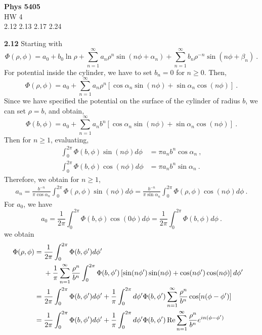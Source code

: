 \documentclass[12pt]{article}
\begin{document}
\begin{center}
{\bf Phys 5405}\\
HW 4 \\
2.12 2.13 2.17 2.24
\end{center}
\textbf{2.12} Starting with
\begin{equation}
    \Phi(\rho, \phi) = a_0 + b_0 \ln \rho + \sum_{n=1}^\infty a_n \rho^n \sin(n \phi + \alpha_n) + \sum_{n=1}^\infty b_n \rho^{-n} \sin(n \phi + \beta_n)~.
\end{equation}
For potential inside the cylinder, we have to set $b_n = 0$ for $n \ge 0$.
Then,
\begin{equation}
    \Phi(\rho, \phi) = a_0 + \sum_{n=1}^\infty a_n \rho^n\left[\cos\alpha_n \sin(n \phi) + \sin \alpha_n  \cos(n \phi)\right]~.
\end{equation}
Since we have specified the potential on the surface of the cylinder of radius $b$, we can set $\rho = b$, and obtain,
\begin{equation}
    \Phi(b, \phi) = a_0 + \sum_{n=1}^\infty a_n b^n \left[\cos\alpha_n \sin(n \phi) + \sin \alpha_n  \cos(n \phi)\right]~.
\end{equation}
Then for $n \ge 1$, evaluating,
\begin{align}
    \int_0^{2\pi} \Phi(b, \phi) \sin(n \phi) d\phi &= \pi a_n b^n \cos\alpha_n ~,\\
    \int_0^{2\pi} \Phi(b, \phi) \cos(n \phi) d\phi & = \pi a_n b^n \sin\alpha_n ~.
\end{align}
Therefore, we obtain for $n \ge 1$,
\begin{align}
    a_n = \frac{b^{-n}}{\pi \cos \alpha_n}  \int_0^{2\pi } \Phi(\rho, \phi) \sin(n \phi) d \phi = \frac{b^{-n}}{\pi \sin \alpha_n}  \int_0^{2\pi } \Phi(\rho, \phi) \cos(n \phi) d \phi~.
\end{align}
For $a_0$, we have
\begin{equation}
    a_0 = \frac{1}{2\pi}\int_0^{2\pi} \Phi(b, \phi) \cos(0 \phi) d\phi = \frac{1}{2\pi} \int_0^{2\pi} \Phi(b,\phi) d\phi~.
\end{equation}
we obtain
\begin{align}
    \Phi(\rho, \phi) &= \frac{1}{2\pi} \int_0^{2\pi} \Phi(b,\phi') d\phi' \cr
    &~~~~+ \frac1\pi \sum_{n=1}^\infty  \frac{\rho^n}{b^n} \int_0^{2\pi} \Phi(b, \phi') \left[\sin(n\phi') \sin(n \phi) + \cos(n \phi') \cos(n \phi)\right]d\phi' \cr
    &= \frac{1}{2\pi} \int_0^{2\pi} \Phi(b,\phi') d\phi' + \frac{1}{\pi} \int_0^{2\pi} d\phi' \Phi(b, \phi')\sum_{n=1}^\infty \frac{\rho^n}{b^n} \cos[n(\phi - \phi')]\cr
    & = \frac{1}{2\pi} \int_0^{2\pi} \Phi(b,\phi') d\phi' + \frac{1}{\pi} \int_0^{2\pi} d\phi' \Phi(b, \phi')\,{\rm Re}\sum_{n=1}^\infty \frac{\rho^n}{b^n} e^{in(\phi - \phi')}
\end{align}
\end{document}
